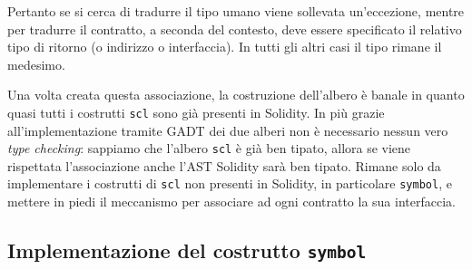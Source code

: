 \documentclass[12pt,a4paper]{report}
\begin{document}
\begin{Shaded}
\begin{Highlighting}[]
\end{Highlighting}
\end{Shaded}

Pertanto se si cerca di tradurre il tipo umano viene sollevata
un'eccezione, mentre per tradurre il contratto, a seconda del contesto,
deve essere specificato il relativo tipo di ritorno (o indirizzo o
interfaccia). In tutti gli altri casi il tipo rimane il medesimo.

Una volta creata questa associazione, la costruzione dell'albero è
banale in quanto quasi tutti i costrutti \texttt{scl} sono già presenti
in Solidity. In più grazie all'implementazione tramite GADT dei due
alberi non è necessario nessun vero \emph{type checking}: sappiamo che
l'albero \texttt{scl} è già ben tipato, allora se viene rispettata
l'associazione anche l'AST Solidity sarà ben tipato. Rimane solo da
implementare i costrutti di \texttt{scl} non presenti in Solidity, in
particolare \texttt{symbol}, e mettere in piedi il meccanismo per
associare ad ogni contratto la sua interfaccia.

\hypertarget{implementazione-del-costrutto-symbol}{%
\subsection{\texorpdfstring{Implementazione del costrutto
\texttt{symbol}}{Implementazione del costrutto symbol}}\label{implementazione-del-costrutto-symbol}}
\end{document}
